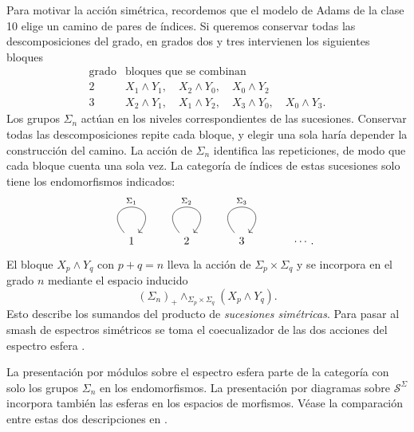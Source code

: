 \begin{samepage}
Para motivar la acción simétrica, recordemos que el modelo de Adams de la clase 10 elige un camino de pares de índices. Si queremos conservar todas las descomposiciones del grado, en grados dos y tres intervienen los siguientes bloques
\[
\begin{array}{c|l}
\text{grado}&\text{bloques que se combinan}\\ \hline
2& X_1\wedge Y_1,\quad X_2\wedge Y_0,\quad X_0\wedge Y_2\\
3& X_2\wedge Y_1,\quad X_1\wedge Y_2,\quad X_3\wedge Y_0,\quad X_0\wedge Y_3 .
\end{array}
\]
Los grupos $\Sigma_n$ actúan en los niveles correspondientes de las sucesiones. Conservar todas las descomposiciones repite cada bloque, y elegir una sola haría depender la construcción del camino. La acción de $\Sigma_n$ identifica las repeticiones, de modo que cada bloque cuenta una sola vez. La categoría de índices de estas sucesiones solo tiene los endomorfismos indicados:
\[
\begin{tikzcd}[column sep=large]
1\arrow[out=130,in=50,loop,"\Sigma_1"]&
2\arrow[out=130,in=50,loop,"\Sigma_2"]&
3\arrow[out=130,in=50,loop,"\Sigma_3"]&\cdots .
\end{tikzcd}
\]
El bloque $X_p\wedge Y_q$ con $p+q=n$ lleva la acción de $\Sigma_p\times\Sigma_q$ y se incorpora en el grado $n$ mediante el espacio inducido
\[
(\Sigma_n)_+\wedge_{\Sigma_p\times\Sigma_q}(X_p\wedge Y_q).
\]
Esto describe los sumandos del producto de \emph{sucesiones simétricas}. Para pasar al smash de espectros simétricos se toma el coecualizador de las dos acciones del espectro esfera \cite[ejemplo~4.2 y §~22, ecuación~(22.2)]{mandell_may_schwede_shipley2001}.

La presentación por módulos sobre el espectro esfera parte de la categoría con solo los grupos $\Sigma_n$ en los endomorfismos. La presentación por diagramas sobre $\mathcal S^\Sigma$ incorpora también las esferas en los espacios de morfismos. Véase la comparación entre estas dos descripciones en \cite[teorema~2.2 y ejemplo~4.2]{mandell_may_schwede_shipley2001}.

\end{samepage}
